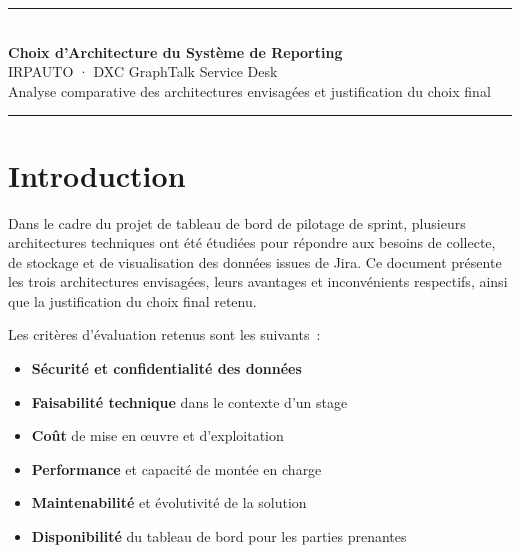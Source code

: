\documentclass[12pt, a4paper]{article}
\begin{document}
\begin{center}
  {\color{dxcpurple}\rule{\linewidth}{1.5pt}}\\[0.5cm]
  {\LARGE\bfseries\color{dxcpurple}
    Choix d'Architecture du Système de Reporting}\\[0.25cm]
  {\large IRPAUTO · DXC GraphTalk Service Desk}\\[0.15cm]
  {\normalsize\color{greytext}
    Analyse comparative des architectures envisagées et justification du choix final}\\[0.4cm]
  {\color{dxcpurple}\rule{\linewidth}{1.5pt}}
\end{center}

\vspace{0.6cm}

\section{Introduction}

Dans le cadre du projet de tableau de bord de pilotage de sprint, plusieurs architectures
techniques ont été étudiées pour répondre aux besoins de collecte, de stockage et de
visualisation des données issues de Jira. Ce document présente les trois architectures
envisagées, leurs avantages et inconvénients respectifs, ainsi que la justification du
choix final retenu.

\vspace{0.3cm}

Les critères d'évaluation retenus sont les suivants~:

\begin{itemize}[leftmargin=2em, itemsep=3pt]
  \item \textbf{Sécurité et confidentialité des données}
  \item \textbf{Faisabilité technique} dans le contexte d'un stage
  \item \textbf{Coût} de mise en \oe uvre et d'exploitation
  \item \textbf{Performance} et capacité de montée en charge
  \item \textbf{Maintenabilité} et évolutivité de la solution
  \item \textbf{Disponibilité} du tableau de bord pour les parties prenantes
\end{itemize}

\end{document}

